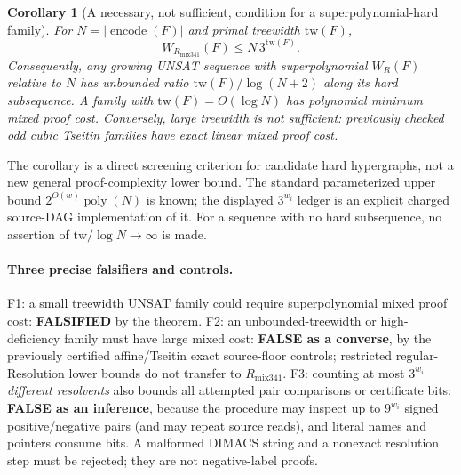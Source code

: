 \documentclass[11pt]{article}
\newtheorem{corollary}{Corollary}
\begin{document}
\begin{corollary}[A necessary, not sufficient, condition for a superpolynomial-hard family]
For $N=|\operatorname{encode}(F)|$ and primal treewidth $\mathrm{tw}(F)$,
\[
W_{R_{\mathrm{mix341}}}(F)\le N\,3^{\mathrm{tw}(F)}.
\]
Consequently, any growing UNSAT sequence with superpolynomial $W_R(F)$ relative to $N$ has unbounded ratio $\mathrm{tw}(F)/\log(N+2)$ along its hard subsequence. A family with $\mathrm{tw}(F)=O(\log N)$ has polynomial minimum mixed proof cost. Conversely, \emph{large treewidth is not sufficient}: previously checked odd cubic Tseitin families have exact linear mixed proof cost.
\end{corollary}
\noindent The corollary is a direct screening criterion for candidate hard hypergraphs, not a new general proof-complexity lower bound. The standard parameterized upper bound $2^{O(w)}\operatorname{poly}(N)$ is known; the displayed $3^{w_i}$ ledger is an explicit charged source-DAG implementation of it. For a sequence with no hard subsequence, no assertion of $\mathrm{tw}/\log N\to\infty$ is made.

\paragraph{Three precise falsifiers and controls.}
F1: a small treewidth UNSAT family could require superpolynomial mixed proof cost: \textbf{FALSIFIED} by the theorem. F2: an unbounded-treewidth or high-deficiency family must have large mixed cost: \textbf{FALSE as a converse}, by the previously certified affine/Tseitin exact source-floor controls; restricted regular-Resolution lower bounds do not transfer to $R_{\mathrm{mix341}}$. F3: counting at most $3^{w_i}$ \emph{different resolvents} also bounds all attempted pair comparisons or certificate bits: \textbf{FALSE as an inference}, because the procedure may inspect up to $9^{w_i}$ signed positive/negative pairs (and may repeat source reads), and literal names and pointers consume bits. A malformed DIMACS string and a nonexact resolution step must be rejected; they are not negative-label proofs.
\end{document}
